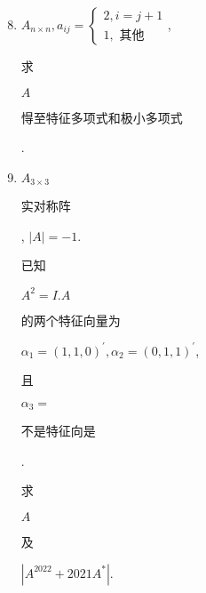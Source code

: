 \documentclass[10pt]{article}
\begin{document}
\begin{enumerate}
  \setcounter{enumi}{7}
  \item $A_{n \times n}, a_{i j}=\left\{\begin{array}{l}2, i=j+1 \\ 1, \text { 其他 }\end{array}\right.$, \begin{CJK}{UTF8}{mj}求\end{CJK} $A$ \begin{CJK}{UTF8}{mj}㥂至特征多项式和极小多项式\end{CJK}.

  \item $A_{3 \times 3}$ \begin{CJK}{UTF8}{mj}实对称阵\end{CJK}, $|A|=-1$. \begin{CJK}{UTF8}{mj}已知\end{CJK} $A^{2}=I . A$ \begin{CJK}{UTF8}{mj}的两个特征向量为\end{CJK} $\alpha_{1}=(1,1,0)^{\prime}, \alpha_{2}=(0,1,1)^{\prime}$, \begin{CJK}{UTF8}{mj}且\end{CJK} $\alpha_{3}=$ \begin{CJK}{UTF8}{mj}不是特征向是\end{CJK}. \begin{CJK}{UTF8}{mj}求\end{CJK} $A$ \begin{CJK}{UTF8}{mj}及\end{CJK} $\left|A^{2022}+2021 A^{*}\right|$.


\end{enumerate}
\end{document}
